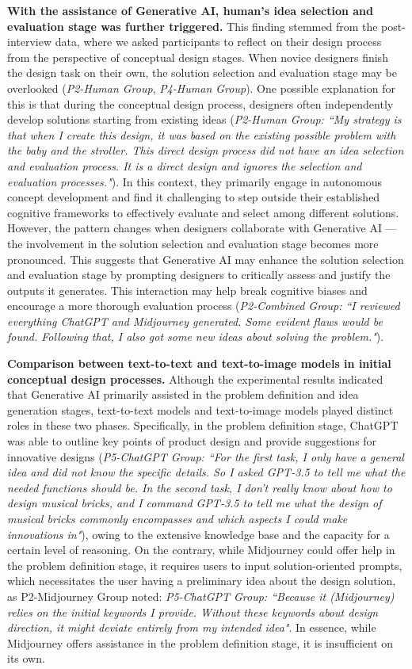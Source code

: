 \documentclass{dsj}
\begin{document}
\textbf{With the assistance of Generative AI, human’s idea selection and evaluation stage was further triggered.} This finding stemmed from the post-interview data, where we asked participants to reflect on their design process from the perspective of conceptual design stages. When novice designers finish the design task on their own, the solution selection and evaluation stage may be overlooked (\textit{P2-Human Group}, \textit{P4-Human Group}). One possible explanation for this is that during the conceptual design process, designers often independently develop solutions starting from existing ideas (\textit{P2-Human Group: ``My strategy is that when I create this design, it was based on the existing possible problem with the baby and the stroller. This direct design process did not have an idea selection and evaluation process. It is a direct design and ignores the selection and evaluation processes."}). In this context, they primarily engage in autonomous concept development and find it challenging to step outside their established cognitive frameworks to effectively evaluate and select among different solutions. However, the pattern changes when designers collaborate with Generative AI —the involvement in the solution selection and evaluation stage becomes more pronounced. This suggests that Generative AI may enhance the solution selection and evaluation stage by prompting designers to critically assess and justify the outputs it generates. This interaction may help break cognitive biases and encourage a more thorough evaluation process (\textit{P2-Combined Group: ``I reviewed everything ChatGPT and Midjourney generated. Some evident flaws would be found. Following that, I also got some new ideas about solving the problem."}).

\textbf{Comparison between text-to-text and text-to-image models in initial conceptual design processes.} Although the experimental results indicated that Generative AI primarily assisted in the problem definition and idea generation stages, text-to-text models and text-to-image models played distinct roles in these two phases. Specifically, in the problem definition stage, ChatGPT was able to outline key points of product design and provide suggestions for innovative designs (\textit{P5-ChatGPT Group: ``For the first task, I only have a general idea and did not know the specific details. So I asked GPT-3.5 to tell me what the needed functions should be. In the second task, I don't really know about how to design musical bricks, and I command GPT-3.5 to tell me what the design of musical bricks commonly encompasses and which aspects I could make innovations in"}), owing to the extensive knowledge base and the capacity for a certain level of reasoning. On the contrary, while Midjourney could offer help in the problem definition stage, it requires users to input solution-oriented prompts, which necessitates the user having a preliminary idea about the design solution, as P2-Midjourney Group noted: \textit{P5-ChatGPT Group: ``Because it (Midjourney) relies on the initial keywords I provide. Without these keywords about design direction, it might deviate entirely from my intended idea"}. In essence, while Midjourney offers assistance in the problem definition stage, it is insufficient on its own. 
\end{document}

